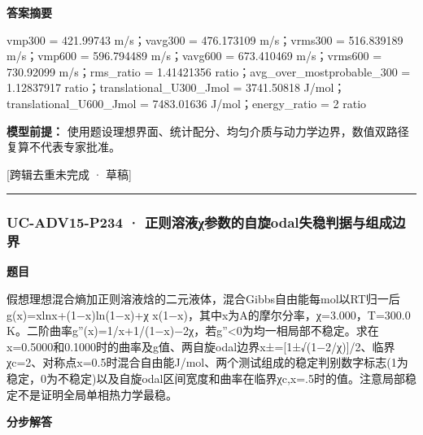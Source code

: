 \documentclass[UTF8,11pt,a4paper]{ctexart}
\begin{document}
\noindent\textbf{答案摘要}\par
vmp300 = 421.99743 m/s；vavg300 = 476.173109 m/s；vrms300 = 516.839189 m/s；vmp600 = 596.794489 m/s；vavg600 = 673.410469 m/s；vrms600 = 730.92099 m/s；rms\_ratio = 1.41421356 ratio；avg\_over\_mostprobable\_300 = 1.12837917 ratio；translational\_U300\_Jmol = 3741.50818 J/mol；translational\_U600\_Jmol = 7483.01636 J/mol；energy\_ratio = 2 ratio\par
\noindent\textbf{模型前提：}
使用题设理想界面、统计配分、均匀介质与动力学边界，数值双路径复算不代表专家批准。\par
\noindent\textcolor{red!65!black}{[跨辑去重未完成 · 草稿]} \par
\medskip\hrule\medskip
{}
\subsubsection*{UC-ADV15-P234 · 正则溶液χ参数的自旋odal失稳判据与组成边界}
\noindent\textbf{题目}\par
假想理想混合熵加正则溶液焓的二元液体，混合Gibbs自由能每mol以RT归一后g(x)=xlnx+(1−x)ln(1−x)+χ x(1−x)，其中x为A的摩尔分率，χ=3.000，T=300.0 K。二阶曲率g''(x)=1/x+1/(1−x)−2χ，若g''<0为均一相局部不稳定。求在x=0.5000和0.1000时的曲率及g值、两自旋odal边界x±=[1±√(1−2/χ)]/2、临界χc=2、对称点x=0.5时混合自由能J/mol、两个测试组成的稳定判别数字标志(1为稳定，0为不稳定)以及自旋odal区间宽度和曲率在临界χc,x=.5时的值。注意局部稳定不是证明全局单相热力学最稳。\par
\medskip\noindent\textbf{分步解答}
\end{document}
